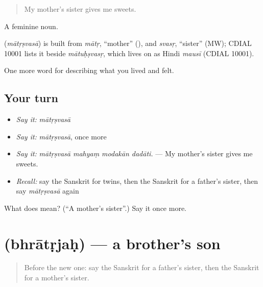 \begin{quote}
My mother's sister gives me sweets.
\end{quote}

A feminine noun.

\begin{cousinweb}
\textbf{} (\emph{mātṛṣvasā}) is built from \emph{mātṛ}, \textquotedblleft{}mother\textquotedblright{} (\textbf{}), and \emph{svasṛ}, \textquotedblleft{}sister\textquotedblright{} (MW); CDIAL 10001 lists it beside \emph{mātuḥṣvasṛ}, which lives on as Hindi \emph{mausī} (CDIAL 10001).
\end{cousinweb}

\begin{grammarlens}[title={What you've built}]
One more word for describing what you lived and felt.
\end{grammarlens}

\subsection*{Your turn}
\begin{itemize}
\raggedright
  \item \emph{Say it:} \emph{mātṛṣvasā}
  \item \emph{Say it:} \emph{mātṛṣvasā}, once more
  \item \emph{Say it:} \emph{mātṛṣvasā mahyaṃ modakān dadāti.} — My mother's sister gives me sweets.
  \item \emph{Recall:} say the Sanskrit for twins, then the Sanskrit for a father's sister, then say \emph{mātṛṣvasā} again
\end{itemize}

\begin{tcolorbox}[breakable,colback=teal!4,colframe=teal!35!black,title={Before you move on}]
What does  mean? (\textquotedblleft{}A mother's sister\textquotedblright{}.) Say it once more.
\end{tcolorbox}
\section[\texorpdfstring{\sk{भ्रातृजः} (bhrātṛjaḥ)}{भ्रातृजः (bhrātṛjaḥ)}]{ (bhrātṛjaḥ) — a brother's son}

\label{lesson:SA-C499-bhratrjah}



\begin{quote}
Before the new one: say the Sanskrit for a father's sister, then the Sanskrit for a mother's sister.
\end{quote}

